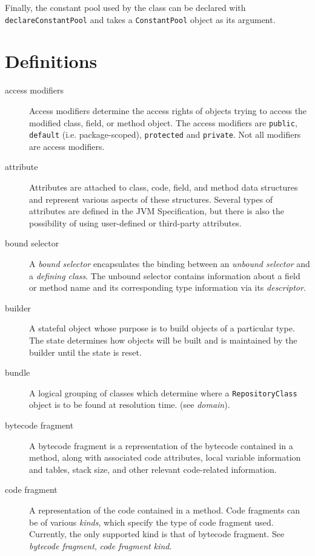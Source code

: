 \documentclass{report}
\begin{document}
Finally, the constant pool used by the class can be declared with 
\texttt{de\-clare\-Con\-stant\-Pool} and takes a 
\texttt{Con\-stant\-Pool} object as its argument.

\chapter{Definitions}\label{defs}

\begin{description}
	\item[access modifiers] Access modifiers determine the access
	rights of objects trying to access the modified class, field, or method
	object. The access modifiers are \texttt{public}, \texttt{default}
	(i.e. package-scoped), \texttt{protected} and \texttt{private}. Not all
	modifiers are access modifiers.

	\item[attribute] Attributes are attached to class, code, field, 
	and method data structures and represent various aspects of these 
	structures. Several types of attributes are defined in the JVM 
	Specification, but there is also the possibility of using user-defined
	or third-party attributes.

	\item[bound selector] A {\em bound selector} encapsulates the
	binding between an {\em unbound selector} and a 
	{\em defining class}. The unbound selector contains information
	about a field or method name and its corresponding type information
	via its {\em descriptor}.

	\item[builder] A stateful object whose purpose is to build objects
	of a particular type. The state determines how objects will
	be built and is maintained by the builder until the state is
	reset.

	\item[bundle] A logical grouping of classes which determine where
	a \texttt{Re\-pos\-i\-tory\-Class} object is to be found at resolution
	time. (see {\em domain}).

	\item[bytecode fragment] A bytecode fragment is a representation
	of the bytecode contained in a method, along with associated
	code attributes, local variable information and tables, stack size,
	and other relevant code-related information.

	\item[code fragment] A representation of the code contained in a
	method. Code fragments can be of various {\em kinds}, which
	specify the type of code fragment used. Currently, the only
	supported kind is that of bytecode fragment. See {\em bytecode
	fragment}, {\em code fragment kind}.


\end{description}
\end{document}
